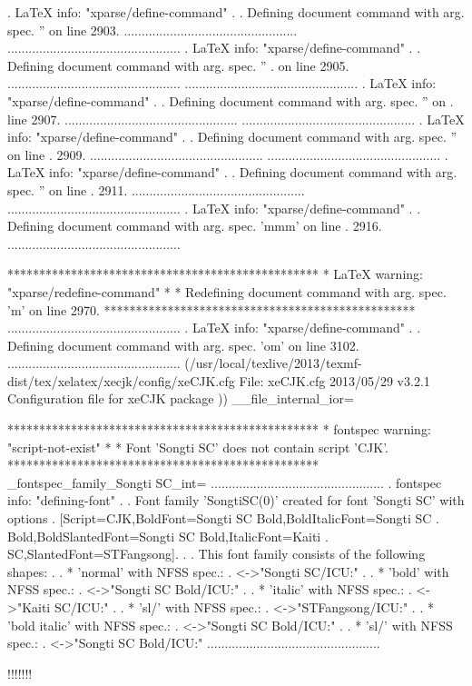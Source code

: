 . LaTeX info: "xparse/define-command"
. 
. Defining document command \CJKnospace with arg. spec. '' on line 2903.
.................................................
.................................................
. LaTeX info: "xparse/define-command"
. 
. Defining document command \xeCJKallowbreakbetweenpuncts with arg. spec. ''
. on line 2905.
.................................................
.................................................
. LaTeX info: "xparse/define-command"
. 
. Defining document command \xeCJKnobreakbetweenpuncts with arg. spec. '' on
. line 2907.
.................................................
.................................................
. LaTeX info: "xparse/define-command"
. 
. Defining document command \xeCJKenablefallback with arg. spec. '' on line
. 2909.
.................................................
.................................................
. LaTeX info: "xparse/define-command"
. 
. Defining document command \xeCJKdisablefallback with arg. spec. '' on line
. 2911.
.................................................
.................................................
. LaTeX info: "xparse/define-command"
. 
. Defining document command \xeCJKsetcharclass with arg. spec. 'mmm' on line
. 2916.
.................................................

*************************************************
* LaTeX warning: "xparse/redefine-command"
* 
* Redefining document command \fontfamily with arg. spec. 'm' on line 2970.
*************************************************
.................................................
. LaTeX info: "xparse/define-command"
. 
. Defining document command \xeCJKcaption with arg. spec. 'om' on line 3102.
.................................................
(/usr/local/texlive/2013/texmf-dist/tex/xelatex/xecjk/config/xeCJK.cfg
File: xeCJK.cfg 2013/05/29 v3.2.1 Configuration file for xeCJK package
))
\g__file_internal_ior=

*************************************************
* fontspec warning: "script-not-exist"
* 
* Font 'Songti SC' does not contain script 'CJK'.
*************************************************
\g_fontspec_family_Songti SC_int=
.................................................
. fontspec info: "defining-font"
. 
. Font family 'SongtiSC(0)' created for font 'Songti SC' with options
. [Script={CJK},BoldFont={Songti SC Bold},BoldItalicFont={Songti SC
. Bold},BoldSlantedFont={Songti SC Bold},ItalicFont={Kaiti
. SC},SlantedFont={STFangsong}].
. 
. This font family consists of the following shapes:
. 
. * 'normal' with NFSS spec.:
. <->"Songti SC/ICU:"
. 
. * 'bold' with NFSS spec.:
. <->"Songti SC Bold/ICU:"
. 
. * 'italic' with NFSS spec.:
. <->"Kaiti SC/ICU:"
. 
. * 'sl/' with NFSS spec.:
. <->"STFangsong/ICU:"
. 
. * 'bold italic' with NFSS spec.:
. <->"Songti SC Bold/ICU:"
. 
. * 'sl/' with NFSS spec.:
. <->"Songti SC Bold/ICU:"
.................................................

!!!!!!!